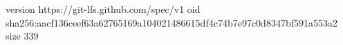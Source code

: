 version https://git-lfs.github.com/spec/v1
oid sha256:aacf136ceef63a62765169a104021486615df4c74b7e97c0d8347bf591a553a2
size 339
